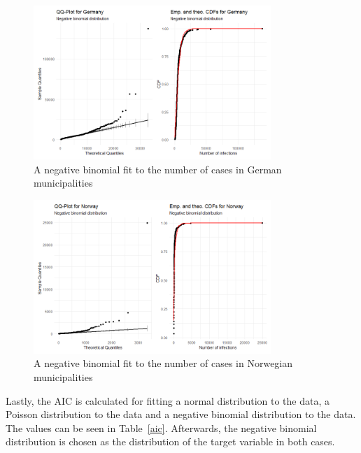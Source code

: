 \begin{figure}[H]
    \centering
    \includegraphics[width = 0.8\textwidth]{fit_nbinom_germany.png}
    \caption{A negative binomial fit to the number of cases in German municipalities}
    \label{fitNegbinomGermany}
\end{figure}
%     
\begin{figure}[H]
    \centering
    \includegraphics[width = 0.8\textwidth]{fit_nbinom_norway.png}
    \caption{A negative binomial fit to the number of cases in Norwegian municipalities}
    \label{fitNegbinomNorway}
\end{figure}
Lastly, the AIC is calculated for fitting a normal distribution to the data, a Poisson distribution to the data and a negative binomial distribution to the data. The values can be seen in Table~\ref{aic}. Afterwards, the negative binomial distribution is chosen as the distribution of the target variable in both cases. \\
